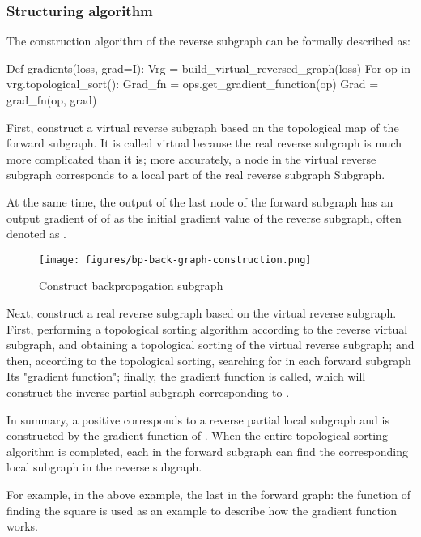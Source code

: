 \begin{content}
\subsubsection{Structuring algorithm}
The construction algorithm of the reverse subgraph can be formally described as:

\begin{leftbar}
\begin{python}
Def gradients(loss, grad=I):
  Vrg = build_virtual_reversed_graph(loss)
  For op in vrg.topological_sort():
    Grad_fn = ops.get_gradient_function(op)
    Grad = grad_fn(op, grad)
\end{python}
\end{leftbar}

First, construct a virtual reverse subgraph based on the topological map of the forward subgraph. It is called virtual because the real reverse subgraph is much more complicated than it is; more accurately, a node in the virtual reverse subgraph corresponds to a local part of the real reverse subgraph Subgraph.

At the same time, the output of the last node of the forward subgraph has an output gradient of  of  as the initial gradient value of the reverse subgraph, often denoted as .

\begin{figure}[!htbp]
  \centering
  \texttt{[image: figures/bp-back-graph-construction.png]}
  \caption{Construct backpropagation subgraph}
  \label{fig:bp-back-graph-construction}
\end{figure}

Next, construct a real reverse subgraph based on the virtual reverse subgraph. First, performing a topological sorting algorithm according to the reverse virtual subgraph, and obtaining a topological sorting of the virtual reverse subgraph; and then, according to the topological sorting, searching for  in each forward subgraph Its "gradient function"; finally, the gradient function is called, which will construct the inverse partial subgraph corresponding to .

In summary, a positive  corresponds to a reverse partial local subgraph and is constructed by the gradient function of . When the entire topological sorting algorithm is completed, each  in the forward subgraph can find the corresponding local subgraph in the reverse subgraph.

For example, in the above example, the last  in the forward graph: the function of finding the square is used as an example to describe how the gradient function works.



\end{content}

